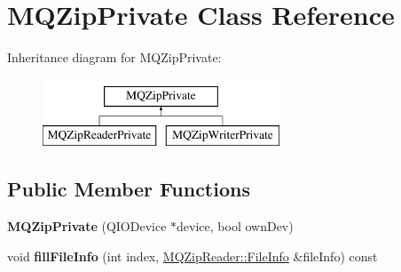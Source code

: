 \hypertarget{class_m_q_zip_private}{}\section{M\+Q\+Zip\+Private Class Reference}
\label{class_m_q_zip_private}
Inheritance diagram for M\+Q\+Zip\+Private\+:\begin{figure}[H]
\begin{center}
\leavevmode
\includegraphics[height=2.000000cm]{class_m_q_zip_private}
\end{center}
\end{figure}
\subsection*{Public Member Functions}
\begin{DoxyCompactItemize}
\item 
\mbox{\label{class_m_q_zip_private_a023e6104f43fbdb43a74dd1327e02c1f}} 
{\bfseries M\+Q\+Zip\+Private} (Q\+I\+O\+Device $\ast$device, bool own\+Dev)
\item 
\mbox{\label{class_m_q_zip_private_a88a9c04ec4415831f6b5ff532e6a8a1a}} 
void {\bfseries fill\+File\+Info} (int index, \hyperlink{struct_m_q_zip_reader_1_1_file_info}{M\+Q\+Zip\+Reader\+::\+File\+Info} \&file\+Info) const
\end{DoxyCompactItemize}
